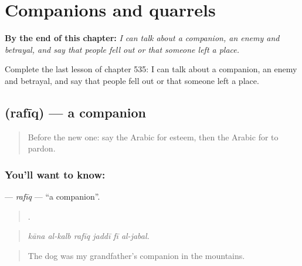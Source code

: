 
\chapter{Companions and quarrels}
\label{ch:ar-companions-and-quarrels}

\begin{chapteropening}
\textbf{By the end of this chapter:} \emph{I can talk about a companion, an enemy and betrayal, and say that people fell out or that someone left a place.}

Complete the last lesson of chapter 535: I can talk about a companion, an enemy and betrayal, and say that people fell out or that someone left a place.
\end{chapteropening}

\section[\texorpdfstring{\ar{رفيق} (rafīq)}{رفيق (rafīq)}]{ (rafīq) — a companion}

\label{lesson:AR-C535-rafiq}



\begin{quote}
Before the new one: say the Arabic for esteem, then the Arabic for to pardon.
\end{quote}

\subsection*{You'll want to know: }
\textbf{} — \emph{rafīq} — \textquotedblleft{}a companion\textquotedblright{}.

\begin{quote}
     .
\end{quote}

\begin{quote}
\emph{kāna al-kalb rafīq jaddī fī al-jabal.}
\end{quote}

\begin{quote}
The dog was my grandfather's companion in the mountains.
\end{quote}

